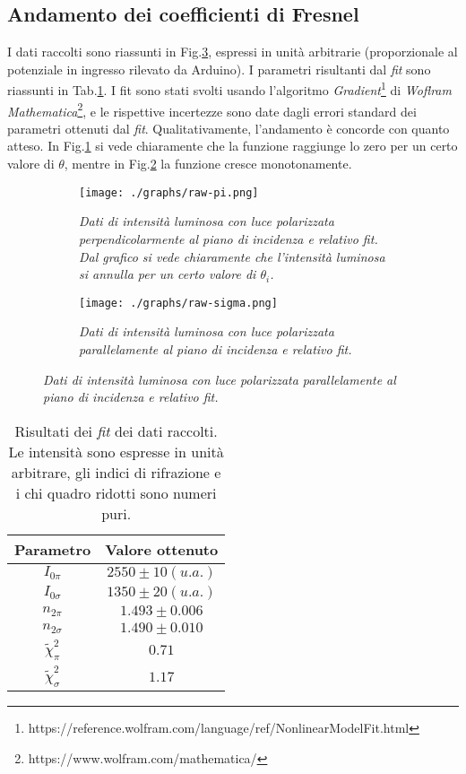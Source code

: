 \subsection{Andamento dei coefficienti di Fresnel}\label{subsec:analisi-coefficienti}
  I dati raccolti sono riassunti in Fig.\ref{fig:dati-raw}, espressi in unità arbitrarie (proporzionale
  al potenziale in ingresso rilevato da Arduino).
  I parametri risultanti dal \emph{fit} sono riassunti in Tab.\ref{tab:risultati-fit}.
  I fit sono stati svolti usando l'algoritmo \emph{Gradient}\footnote{https://reference.wolfram.com/language/ref/NonlinearModelFit.html} di \emph{Woflram Mathematica}\footnote{https://www.wolfram.com/mathematica/}, e le rispettive incertezze %
  sono date dagli errori standard dei parametri ottenuti dal \emph{fit}.                                          %
  Qualitativamente, l'andamento è concorde con quanto atteso. In Fig.\ref{fig:raw-pi}
  si vede chiaramente che la funzione raggiunge lo zero per un certo valore di $\theta$,
  mentre in Fig.\ref{fig:raw-sigma} la funzione cresce monotonamente.
  \begin{figure}[H]
    \centering
    \caption{Dati raccolti}
    \begin{subfigure}[t]{.4\textwidth}
      \texttt{[image: ./graphs/raw-pi.png]}
      \caption{
        \emph{
          Dati di intensità luminosa con luce polarizzata perpendicolarmente al
          piano di incidenza e relativo fit. Dal grafico si vede chiaramente che
          l'intensità luminosa si annulla per un certo valore di $\theta_i$.
        }
      }
      \label{fig:raw-pi}
    \end{subfigure}
    \hspace{20mm}
    \begin{subfigure}[t]{.4\textwidth}
      \texttt{[image: ./graphs/raw-sigma.png]}
      \caption{
        \emph{
          Dati di intensità luminosa con luce polarizzata parallelamente al
          piano di incidenza e relativo fit.
        }
      }
      \label{fig:raw-sigma}
    \end{subfigure}
    \label{fig:dati-raw}
  \end{figure}
  \begin{table}[ht]
    \centering
    \caption{
      Risultati dei \emph{fit} dei dati raccolti. Le intensità sono espresse in unità arbitrare, gli indici
      di rifrazione e i chi quadro ridotti sono numeri puri.
    }
    \begin{tabular}[t]{cc}
      \toprule
      Parametro &Valore ottenuto\\
      \midrule
      $I_{0\pi}$ &$2550 \pm 10 (u. a.)$ \\
      $I_{0\sigma}$ &$1350 \pm 20 (u. a.)$ \\
      $n_{2\pi}$ &$1.493 \pm 0.006$    \\
      $n_{2\sigma}$ &$1.490 \pm 0.010$    \\
      $\tilde \chi^2_\pi$ &$0.71$ \\
      $\tilde \chi^2_\sigma$ &$1.17$ \\
      \bottomrule
    \end{tabular}\label{tab:risultati-fit}
  \end{table}
